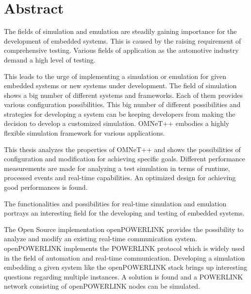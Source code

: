 \chapter{Abstract}

The fields of simulation and emulation are steadily gaining importance for the development of embedded systems.
This is caused by the raising requirement of comprehensive testing.
Various fields of application as the automotive industry demand a high level of testing.

This leads to the urge of implementing a simulation or emulation for given embedded systems or new systems under development.
The field of simulation shows a big number of different systems and frameworks.
Each of them provides various configuration possibilities.
This big number of different possibilities and strategies for developing a system can be keeping developers from making the decision to develop a customized simulation.
OMNeT++ embodies a highly flexible simulation framework for various applications.

This thesis analyzes the properties of OMNeT++ and shows the possibilities of configuration and modification for achieving specific goals.
Different performance measurements are made for analyzing a test simulation in terms of runtime, processed events and real-time capabilities.
An optimized design for achieving good performances is found.

The functionalities and possibilities for real-time simulation and emulation portrays an interesting field for the developing and testing of embedded systems.

The Open Source implementation openPOWERLINK provides the possibility to analyze and modify an existing real-time communication system.
openPOWERLINK implements the POWERLINK protocol which is widely used in the field of automation and real-time communication.
Developing a simulation embedding a given system like the openPOWERLINK stack brings up interesting questions regarding multiple instances.
A solution is found and a POWERLINK network consisting of openPOWERLINK nodes can be simulated.
